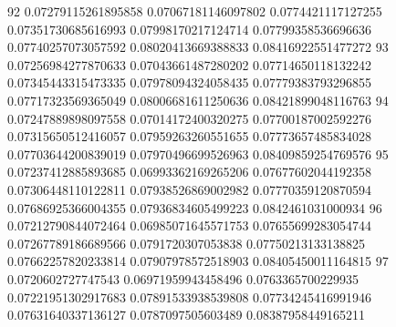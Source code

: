 92 0.07279115261895858 0.07067181146097802 0.0774421117127255 0.07351730685616993 0.07998170217124714 0.07799358536696636 0.07740257073057592 0.08020413669388833 0.08416922551477272
93 0.07256984277870633 0.07043661487280202 0.07714650118132242 0.07345443315473335 0.07978094324058435 0.07779383793296855 0.07717323569365049 0.08006681611250636 0.08421899048116763
94 0.07247889898097558 0.07014172400320275 0.07700187002592276 0.07315650512416057 0.07959263260551655 0.07773657485834028 0.07703644200839019 0.07970496699526963 0.08409859254769576
95 0.07237412885893685 0.06993362169265206 0.07677602044192358 0.07306448110122811 0.07938526869002982 0.07770359120870594 0.07686925366004355 0.07936834605499223 0.0842461031000934
96 0.07212790844072464 0.06985071645571753 0.07655699283054744 0.07267789186689566 0.0791720307053838 0.07750213133138825 0.07662257820233814 0.07907978572518903 0.08405450011164815
97 0.0720602727747543 0.06971959943458496 0.0763365700229935 0.07221951302917683 0.07891533938539808 0.07734245416991946 0.07631640337136127 0.0787097505603489 0.08387958449165211
